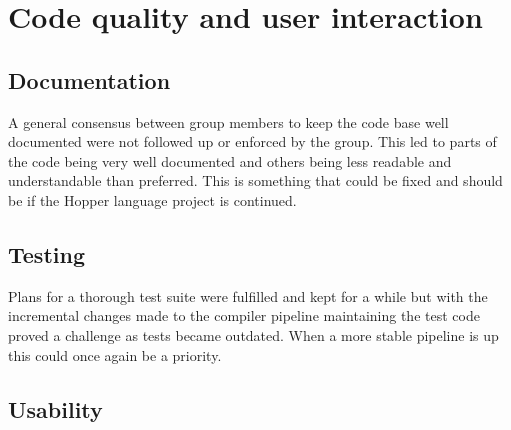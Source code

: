 \section{Code quality and user interaction}

\subsection{Documentation}

A general consensus between group members to keep the code base well documented were not followed up or enforced by the group. This led to parts of the code being very well documented and others being less readable and understandable than preferred. This is something that could be fixed and should be if the Hopper language project is continued.

\subsection{Testing}

Plans for a thorough test suite were fulfilled and kept for a while but with the incremental changes made to the compiler pipeline maintaining the test code proved a challenge as tests became outdated. When a more stable pipeline is up this could once again be a priority.

\subsection{Usability}



